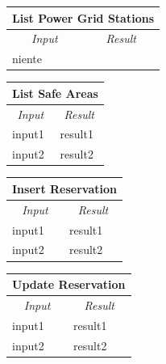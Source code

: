 \documentclass[english]{article}
\begin{document}
\begin{center}

	\begin{tabular}{ | p{6cm} | p{6cm} | }
		\hline 


		\hline

		\multicolumn{2}{|c|}{\textbf{List Power Grid Stations}} \\
		\hline
		\multicolumn{1}{|c|}{\textit{Input}} & \multicolumn{1}{c|}{\textit{Result}} \\
		\hline
		niente &  \\
		\hline
	\end{tabular}
\end{center}

\begin{center}

	\begin{tabular}{ | p{6cm} | p{6cm} | }
		\hline 


		\hline

		\multicolumn{2}{|c|}{\textbf{List Safe Areas}} \\
		\hline
		\multicolumn{1}{|c|}{\textit{Input}} & \multicolumn{1}{c|}{\textit{Result}} \\
		\hline
		input1 & result1 \\
		\hline
		input2 & result2 \\
		\hline
	\end{tabular}
\end{center}

\begin{center}

	\begin{tabular}{ | p{6cm} | p{6cm} | }
		\hline 


		\hline

		\multicolumn{2}{|c|}{\textbf{Insert Reservation}} \\
		\hline
		\multicolumn{1}{|c|}{\textit{Input}} & \multicolumn{1}{c|}{\textit{Result}} \\
		\hline
		input1 & result1 \\
		\hline
		input2 & result2 \\
		\hline
	\end{tabular}
\end{center}

\begin{center}

	\begin{tabular}{ | p{6cm} | p{6cm} | }
		\hline 


		\hline

		\multicolumn{2}{|c|}{\textbf{Update Reservation}} \\
		\hline
		\multicolumn{1}{|c|}{\textit{Input}} & \multicolumn{1}{c|}{\textit{Result}} \\
		\hline
		input1 & result1 \\
		\hline
		input2 & result2 \\
		\hline
	\end{tabular}
\end{center}
\end{document}
